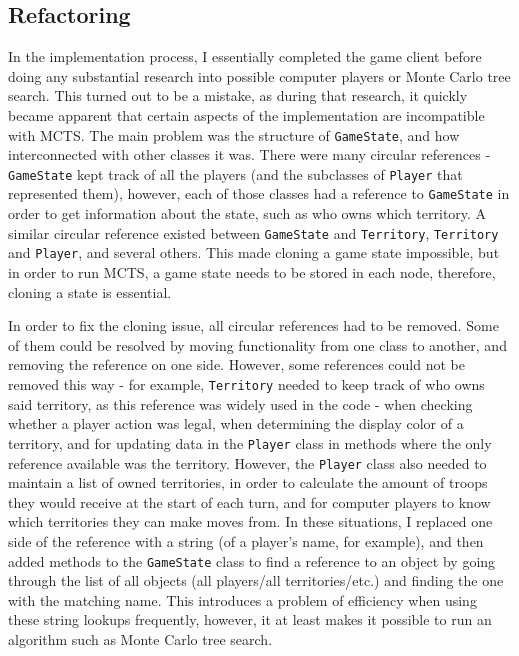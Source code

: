 \subsection{Refactoring}
\label{refactoring}

In the implementation process, I essentially completed the game client before doing any substantial research into possible computer players or Monte Carlo tree search. This turned out to be a mistake, as during that research, it quickly became apparent that certain aspects of the implementation are incompatible with MCTS. The main problem was the structure of \texttt{GameState}, and how interconnected with other classes it was. There were many circular references - \texttt{GameState} kept track of all the players (and the subclasses of \texttt{Player} that represented them), however, each of those classes had a reference to \texttt{GameState} in order to get information about the state, such as who owns which territory. A similar circular reference existed between \texttt{GameState} and \texttt{Territory}, \texttt{Territory} and \texttt{Player}, and several others. This made cloning a game state impossible, but in order to run MCTS, a game state needs to be stored in each node, therefore, cloning a state is essential.

In order to fix the cloning issue, all circular references had to be removed. Some of them could be resolved by moving functionality from one class to another, and removing the reference on one side. However, some references could not be removed this way - for example, \texttt{Territory} needed to keep track of who owns said territory, as this reference was widely used in the code - when checking whether a player action was legal, when determining the display color of a territory, and for updating data in the \texttt{Player} class in methods where the only reference available was the territory. However, the \texttt{Player} class also needed to maintain a list of owned territories, in order to calculate the amount of troops they would receive at the start of each turn, and for computer players to know which territories they can make moves from. In these situations, I replaced one side of the reference with a string (of a player's name, for example), and then added methods to the \texttt{GameState} class to find a reference to an object by going through the list of all objects (all players/all territories/etc.) and finding the one with the matching name. This introduces a problem of efficiency when using these string lookups frequently, however, it at least makes it possible to run an algorithm such as Monte Carlo tree search.


